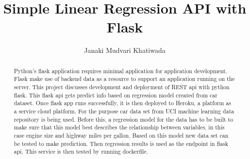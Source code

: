 
\title{Simple Linear Regression API with Flask}



\author{Janaki Mudvari Khatiwada}


\renewcommand{\shortauthors}{J. M. Khatiwada}



\begin{abstract}
  Python's flask application requires minimal application for application
  development. Flask make use of backend data as a resource to support an
  application running on the server. This project discusses development
  and deployment of REST api with python flask. This flask api gets predict
  info based on regression model created from car dataset. Once flask app runs 
  successfully, it is then deployed to Heroku, a platform as a service 
  cloud platform. For the purpose car data set from UCI machine learning
  data repository is being used. Before this, a regression model for the
  data has to be built to make sure that this model best describes the 
  relationship between variables, in this case engine size and highway
  miles per gallon. Based on this model new data set can be tested to make 
  prediction. Then regression results is used as the endpoint 
  in flask api. This service is then tested by running dockerfile.
   
\end{abstract}



\maketitle

